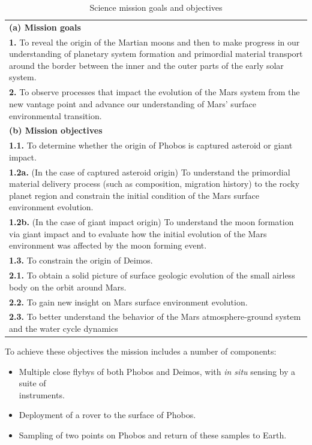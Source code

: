 \begin{table}[hbt!]
	\centering %
	\caption{Science mission goals and objectives}
	\label{table:goals}
	\small
	\begin{tabular}{|p{15cm}|}
		\hline
		\textbf{(a) Mission goals} \\
		\textbf{1.} To reveal the origin of the Martian moons and then to make progress in our
		understanding of planetary system formation and primordial material transport
		around the border between the inner and the outer parts of the early solar system. \\
		\textbf{2.} To observe processes that impact the evolution of the Mars system from the new
		vantage point and advance our understanding of Mars’ surface environmental
		transition. \\	
		\hline
		\textbf{(b) Mission objectives} \\
		\textbf{1.1.} To determine whether the origin of Phobos is captured asteroid or giant impact. \\
		\textbf{1.2a.} (In the case of captured asteroid origin) To understand the primordial
		material delivery process (such as composition, migration history) to the rocky
		planet region and constrain the initial condition of the Mars surface environment
		evolution. \\
		\textbf{1.2b.} (In the case of giant impact origin) To understand the moon formation via
		giant impact and to evaluate how the initial evolution of the Mars environment was
		affected by the moon forming event. \\
		\textbf{1.3.} To constrain the origin of Deimos. \\
		\textbf{2.1.} To obtain a solid picture of surface geologic evolution of the small airless body on
		the orbit around Mars. \\
		\textbf{2.2.} To gain new insight on Mars surface environment evolution. \\
		\textbf{2.3.} To better understand the behavior of the Mars atmosphere-ground system and the
		water cycle dynamics \\
		\hline
	\end{tabular}
\end{table}

To achieve these objectives the mission includes a number of components: 
\begin{itemize}
  	\setlength{\itemsep}{3pt}
	\setlength{\parskip}{0pt}
	\item Multiple close flybys of both Phobos and Deimos, with \textit{in situ} sensing by a suite of \\ instruments.
	\item Deployment of a rover to the surface of Phobos.
	\item Sampling of two points on Phobos and return of these samples to Earth.
\end{itemize}

